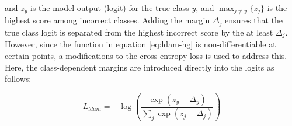 \noindent and $z_y$ is the model output (logit) for the true class $y$, and $\max_{j \neq y}\{z_j\}$ is the highest score among incorrect classes. Adding the margin $\Delta_j$ ensures that the true class logit is separated from the highest incorrect score by the at least $\Delta_j$. However, since the function in equation \eqref{eq:ldam-hg} is non-differentiable at certain points, a modifications to the cross-entropy loss is used to address this. Here, the class-dependent margins are introduced directly into the logits as follows:

\begin{equation}
    \label{eq:ldam}
    L_{ldam} = - \log\left( \frac{\exp(z_y - \Delta_y)}{\sum_j \exp(z_j - \Delta_j)} \right)
\end{equation}